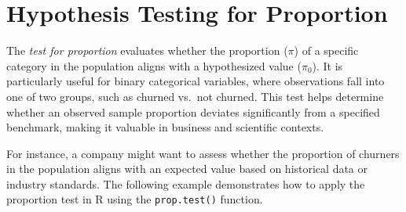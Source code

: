 \documentclass[
  11pt,
]{book}
\newcommand{\passthrough}[1]{#1}
\theoremstyle{definition}
\theoremstyle{definition}
\theoremstyle{definition}
\theoremstyle{definition}
\theoremstyle{remark}
\begin{document}
\section{Hypothesis Testing for Proportion}\label{hypothesis-testing-for-proportion}

The \emph{test for proportion} evaluates whether the proportion (\(\pi\)) of a specific category in the population aligns with a hypothesized value (\(\pi_0\)). It is particularly useful for binary categorical variables, where observations fall into one of two groups, such as churned vs.~not churned. This test helps determine whether an observed sample proportion deviates significantly from a specified benchmark, making it valuable in business and scientific contexts.

For instance, a company might want to assess whether the proportion of churners in the population aligns with an expected value based on historical data or industry standards. The following example demonstrates how to apply the proportion test in R using the \passthrough{\lstinline!prop.test()!} function.
\end{document}
